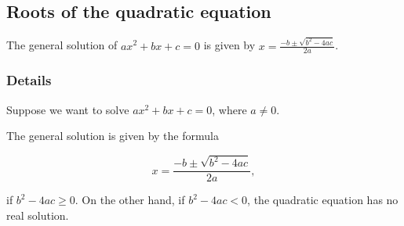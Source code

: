\documentclass[12pt,a4paper]{article}
\theoremstyle{regla}
\theoremstyle{remark}
\theoremstyle{definition}
\theoremstyle{nonumberbreak}
\begin{document}
\subsection{Roots of the quadratic equation}
\begin{fbox}
\begin{minipage}{0.97\textwidth}
The general solution of $ax^2 + bx + c = 0$ is given by $ x = \frac{-b \pm \sqrt{b^2 - 4ac}}{2a}$.
\end{minipage}
\end{fbox}
\subsubsection{Details}
Suppose we want to solve $ax^2 + bx + c = 0$, where 
$a \neq 0$.

The general solution is given by the formula

$$ x = \frac{-b \pm \sqrt{b^2 - 4ac}}{2a},$$

if  $b^2 - 4ac \geq 0$. On the other hand, if $b^2-4ac<0$, the quadratic equation has no real solution.
\end{document}
